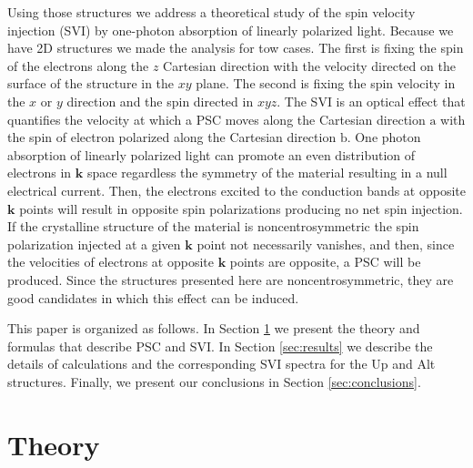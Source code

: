 \documentclass[floatfix,prb,aps,superscriptaddress,showpacs,11pt,preprint,letterpaper]{revtex4}
\begin{document}
Using those structures we address a theoretical study of the 
spin velocity
injection (SVI) 
by one-photon absorption of linearly polarized light.
Because we have 2D structures we made the analysis for tow cases. The first is
fixing the spin of the electrons along the $z$ Cartesian direction with the
velocity directed on the surface of the structure in the $xy$ plane. The second
is fixing the spin velocity in the $x$ or $y$ direction and the spin directed
in $xyz$.
% 
The SVI is an optical effect that quantifies the velocity at which a PSC moves
along the Cartesian direction $\mathrm{a}$ with the spin of electron polarized
along the Cartesian direction $\mathrm{b}$. One photon absorption of linearly
polarized light can promote an even distribution of electrons in $\mathbf{k}$ space
regardless the symmetry of the material resulting in a 
null electrical current.\cite{bhatPRL05}
Then, the electrons excited to the conduction bands at opposite $\mathbf{k}$
points will result in opposite spin polarizations producing no net spin
injection.\cite{bhatPRL05} If the crystalline structure of the material is
noncentrosymmetric the spin polarization injected at a given $\mathbf{k}$ point
not necessarily 
 vanishes,\cite{alvaradoPRL85, schmiedeskampPRL88} 
and then, since the velocities of electrons at opposite $\mathbf{k}$ points are
opposite, a PSC will be produced. Since the structures presented
here are noncentrosymmetric, they are good candidates in which this effect can
be induced.

This paper is organized as follows. In Section \ref{sec:theory} we present the
theory and formulas that describe PSC and SVI. In Section \ref{sec:results} we
describe the details of calculations and the corresponding SVI spectra for the
Up and Alt structures. Finally, we present our conclusions in
Section \ref{sec:conclusions}.



\section{Theory} %
\label{sec:theory}
\end{document}
